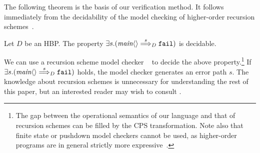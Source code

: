 The following theorem is the basis of our verification method. It 
follows immediately from the decidability of the model checking of 
higher-order recursion schemes~\cite{Ong2006}.
\begin{theorem}
\label{th:decidability}Let \(D\) be an HBP. The property \(\exists 
s.(\textit{main}\langle{}\rangle\stackrel{s}{\Longrightarrow}_{D} \mathtt{fail})\) is decidable.
\end{theorem}
We can use a recursion scheme model checker 
\trecs{}~\cite{Kobayashi2009,Kobayashi2009d} to decide the above 
property.\footnote{The gap between the operational semantics of our 
language and that of recursion schemes can be filled by the CPS 
transformation. Note also that finite state or pushdown model checkers 
cannot be used, as higher-order programs are in general strictly more 
expressive~\cite{Damm1982}.} If \(\exists 
s.(\textit{main}\langle{}\rangle\stackrel{s}{\Longrightarrow}_{D} \mathtt{fail})\) holds, the model 
checker generates an error path \(s\). The knowledge about recursion 
schemes is unnecessary for understanding the rest of this paper, but an 
interested reader may wish to consult 
\cite{Ong2006,Kobayashi2009,Kobayashi2009c}.

